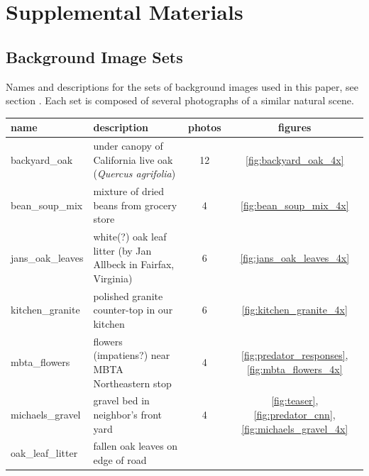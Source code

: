 \documentclass[letterpaper]{article}
\begin{document}






\appendix
\onecolumn
\section{Supplemental Materials}
\setcounter{page}{0}

\subsection{Background Image Sets}
\begin{minipage}{\linewidth}
Names and descriptions for the sets of background images used in this paper, see section . Each set is composed of several photographs of a similar natural scene.
\par
\hspace*{1cm}
\begin{minipage}{\linewidth-1.1cm}
\begin{table}[H]
\raggedright 
\begin{tabular}{ |l|l|c|c| }
\hline
\textbf{name} & \textbf{description} & \textbf{photos} & \textbf{figures} \\ 
\hline
backyard\_oak &
    under canopy of California live oak (\textit{Quercus agrifolia}) &
    12 & \ref{fig:backyard_oak_4x} \\
\hline
bean\_soup\_mix &
    mixture of dried beans from grocery store &
    4 & \ref{fig:bean_soup_mix_4x} \\
\hline
jans\_oak\_leaves &
    white(?) oak leaf litter (by Jan Allbeck in Fairfax, Virginia) &
    6 & \ref{fig:jans_oak_leaves_4x} \\
\hline
kitchen\_granite &
    polished granite counter-top in our kitchen &
    6 & \ref{fig:kitchen_granite_4x} \\
\hline
mbta\_flowers &
    flowers (impatiens?) near MBTA Northeastern stop &
    4 & \ref{fig:predator_responses}, \ref{fig:mbta_flowers_4x} \\
\hline
michaels\_gravel &
    gravel bed in neighbor’s front yard &
    4 & \ref{fig:teaser}, \ref{fig:predator_cnn}, \ref{fig:michaels_gravel_4x} \\
\hline
oak\_leaf\_litter &
    fallen oak leaves on edge of road &

\end{tabular}
\end{table}
\end{minipage}
\end{minipage}
\end{document}
